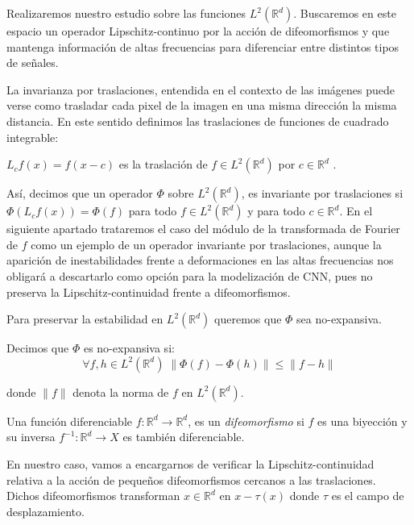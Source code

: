 \medskip


\noindent Realizaremos nuestro estudio sobre las funciones $L^2(\mathbb{R}^d)$. Buscaremos en este espacio un operador Lipschitz-continuo por la acción de difeomorfismos y que mantenga información de altas frecuencias para diferenciar entre distintos tipos de señales. 

\medskip

\noindent La invarianza por traslaciones, entendida en el contexto de las imágenes puede verse como trasladar cada pixel de la imagen en una misma dirección la misma distancia. En este sentido definimos las traslaciones de funciones de cuadrado integrable: 

\begin{definicion}
$L_cf(x)=f(x-c)$ es la traslación de $f \in L^2(\mathbb{R}^d)$ por $c \in \mathbb{R}^d$ .
\end{definicion}

\medskip

\noindent Así, decimos que un operador $\Phi$ sobre  $L^2(\mathbb{R}^d)$, es invariante por traslaciones si $\Phi(L_cf(x))=\Phi(f)$ para todo $f \in L^2(\mathbb{R}^d)$ y para todo $c \in \mathbb{R}^d$. En el siguiente apartado trataremos el caso del módulo de la transformada de Fourier de $f$ como un ejemplo de un operador invariante por traslaciones, aunque la aparición de inestabilidades frente a deformaciones en las altas frecuencias nos obligará a descartarlo como opción para la modelización de CNN, pues no preserva la Lipschitz-continuidad frente a difeomorfismos.

\medskip

\noindent Para preservar la estabilidad en $L^2(\mathbb{R}^d)$ queremos que $\Phi$ sea no-expansiva.

\begin{definicion}
Decimos que $\Phi$ es no-expansiva si: 
$$\forall f,h \in L^2(\mathbb{R}^d)\; \| \Phi(f)-\Phi(h)\| \leq \|f-h\|$$
\end{definicion}

\noindent donde $\| f\|$ denota la norma de $f$ en  $L^2(\mathbb{R}^d)$.


\begin{definicion}
  Una función diferenciable $f: \mathbb{R}^d \rightarrow \mathbb{R}^d$, es un \textit{difeomorfismo} si $f$ es una biyección y su inversa $f^{-1}:\mathbb{R}^d \rightarrow X$ es también diferenciable. 
\end{definicion}


\noindent En nuestro caso, vamos a encargarnos de verificar la Lipschitz-continuidad relativa a la acción de pequeños difeomorfismos cercanos a las traslaciones. Dichos difeomorfismos transforman $x \in \mathbb{R}^d$ en $x-\tau (x)$ donde $\tau$ es el campo de desplazamiento. 

